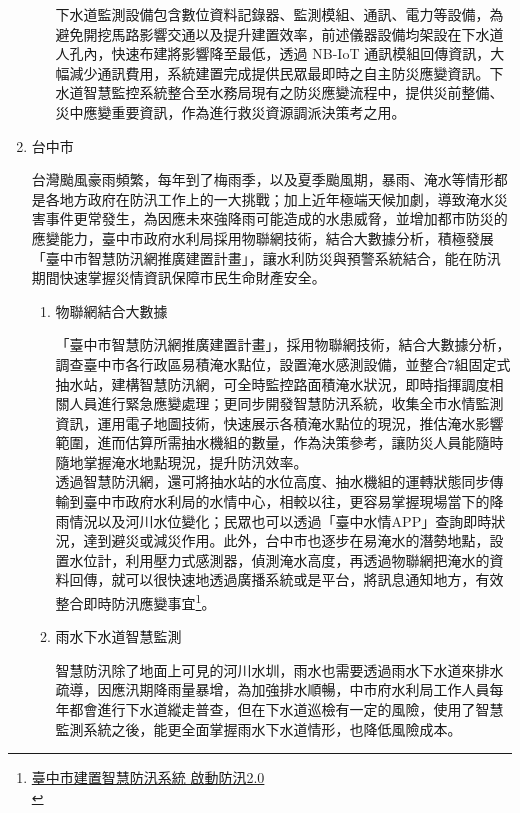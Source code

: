 \documentclass[a4paper,12pt]{article}
\begin{document}
\begin{enumerate}
\begin{enumerate}
下水道監測設備包含數位資料記錄器、監測模組、通訊、電力等設備，為避免開挖馬路影響交通以及提升建置效率，前述儀器設備均架設在下水道人孔內，快速布建將影響降至最低，透過 NB-IoT 通訊模組回傳資訊，大幅減少通訊費用，系統建置完成提供民眾最即時之自主防災應變資訊。下水道智慧監控系統整合至水務局現有之防災應變流程中，提供災前整備、災中應變重要資訊，作為進行救災資源調派決策考之用。\\
\end{enumerate}

\item 台中市
\label{sec:orgd50cf47}

台灣颱風豪雨頻繁，每年到了梅雨季，以及夏季颱風期，暴雨、淹水等情形都是各地方政府在防汛工作上的一大挑戰；加上近年極端天候加劇，導致淹水災害事件更常發生，為因應未來強降雨可能造成的水患威脅，並增加都市防災的應變能力，臺中市政府水利局採用物聯網技術，結合大數據分析，積極發展「臺中市智慧防汛網推廣建置計畫」，讓水利防災與預警系統結合，能在防汛期間快速掌握災情資訊保障市民生命財產安全。\\
\begin{enumerate}
\item 物聯網結合大數據
\label{sec:org6be7840}

「臺中市智慧防汛網推廣建置計畫」，採用物聯網技術，結合大數據分析，調查臺中市各行政區易積淹水點位，設置淹水感測設備，並整合7組固定式抽水站，建構智慧防汛網，可全時監控路面積淹水狀況，即時指揮調度相關人員進行緊急應變處理；更同步開發智慧防汛系統，收集全市水情監測資訊，運用電子地圖技術，快速展示各積淹水點位的現況，推估淹水影響範圍，進而估算所需抽水機組的數量，作為決策參考，讓防災人員能隨時隨地掌握淹水地點現況，提升防汛效率。\\

透過智慧防汛網，還可將抽水站的水位高度、抽水機組的運轉狀態同步傳輸到臺中市政府水利局的水情中心，相較以往，更容易掌握現場當下的降雨情況以及河川水位變化；民眾也可以透過「臺中水情APP」查詢即時狀況，達到避災或減災作用。此外，台中市也逐步在易淹水的潛勢地點，設置水位計，利用壓力式感測器，偵測淹水高度，再透過物聯網把淹水的資料回傳，就可以很快速地透過廣播系統或是平台，將訊息通知地方，有效整合即時防汛應變事宜\footnote{\href{https://news.cts.com.tw/cts/general/202004/202004171997574.html}{臺中市建置智慧防汛系統 啟動防汛2.0}\\}。\\
\item 雨水下水道智慧監測
\label{sec:orgc40807b}

智慧防汛除了地面上可見的河川水圳，雨水也需要透過雨水下水道來排水疏導，因應汛期降雨量暴增，為加強排水順暢，中市府水利局工作人員每年都會進行下水道縱走普查，但在下水道巡檢有一定的風險，使用了智慧監測系統之後，能更全面掌握雨水下水道情形，也降低風險成本。\\


\end{enumerate}
\end{enumerate}
\end{document}
